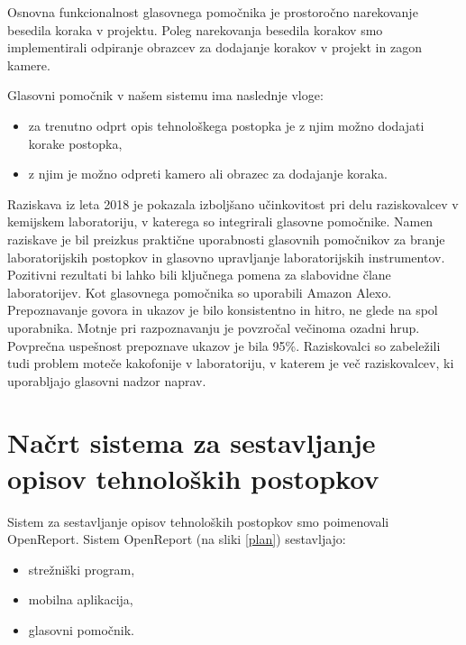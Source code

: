 \documentclass[a4paper, 12pt]{book}
\begin{document}

Osnovna funkcionalnost glasovnega pomočnika je prostoročno narekovanje besedila koraka v projektu.
Poleg narekovanja besedila korakov smo implementirali odpiranje obrazcev za dodajanje korakov v projekt in zagon kamere.

\bigbreak 
Glasovni pomočnik v našem sistemu ima naslednje vloge:
\begin{itemize}
	\item za trenutno odprt opis tehnološkega postopka je z njim možno dodajati korake postopka,
	\item z njim je možno odpreti kamero ali obrazec za dodajanje koraka.
\end{itemize}

Raziskava iz leta 2018 \cite{austerjost2018introducing} je pokazala izboljšano učinkovitost pri delu raziskovalcev v kemijskem laboratoriju, v katerega so integrirali glasovne pomočnike.
Namen raziskave je bil preizkus praktične uporabnosti glasovnih pomočnikov za branje laboratorijskih postopkov in glasovno upravljanje laboratorijskih instrumentov.
Pozitivni rezultati bi lahko bili ključnega pomena za slabovidne člane laboratorijev.
Kot glasovnega pomočnika so uporabili Amazon Alexo.
Prepoznavanje govora in ukazov je bilo konsistentno in hitro, ne glede na spol uporabnika.
Motnje pri razpoznavanju je povzročal večinoma ozadni hrup.
Povprečna uspešnost prepoznave ukazov je bila 95\%.
Raziskovalci so zabeležili tudi problem moteče kakofonije v laboratoriju, v katerem je več raziskovalcev, ki uporabljajo glasovni nadzor naprav.

\section{Načrt sistema za sestavljanje opisov tehnoloških postopkov}



Sistem za sestavljanje opisov tehnoloških postopkov smo poimenovali OpenReport. 
Sistem OpenReport (na sliki \ref{plan}) sestavljajo:

\begin{itemize}
	\item strežniški program, 
	\item mobilna aplikacija,
	\item glasovni pomočnik.
\end{itemize}
\end{document}

